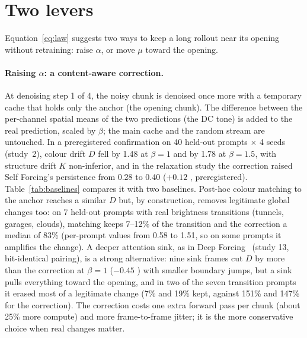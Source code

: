\section{Two levers}\label{sec:levers}
Equation~\ref{eq:law} suggests two ways to keep a long rollout near its opening without retraining: raise $\alpha$, or
move $\mu$ toward the opening.

\paragraph{Raising $\alpha$: a content-aware correction.} At denoising step 1 of 4, the noisy chunk is denoised once
more with a temporary cache that holds only the anchor (the opening chunk). The difference between the per-channel
spatial means of the two predictions (the DC tone) is added to the real prediction, scaled by $\beta$; the main cache
and the random stream are untouched. In a preregistered confirmation on 40 held-out prompts $\times$ 4 seeds
(study~2), colour drift $D$ fell by 1.48  at $\beta=1$ and by 1.78  at $\beta=1.5$, with
structure drift $K$ non-inferior, and in the relaxation study the correction raised Self Forcing's persistence from 0.28
to 0.40 ($+0.12$ , preregistered). Table~\ref{tab:baselines} compares it with two baselines. Post-hoc
colour matching to the anchor reaches a similar $D$ but, by construction, removes legitimate global changes too: on 7
held-out prompts with real brightness transitions (tunnels, garages, clouds), matching keeps 7--12\% of the transition
and the correction a median of 83\% (per-prompt values from 0.58 to 1.51, so on some prompts it amplifies the change). A
deeper attention sink, as in Deep Forcing~\cite{deepforcing} (study 13, bit-identical pairing), is a strong alternative:
nine sink frames cut $D$ by more than the correction at $\beta=1$ ($-0.45$ ) with smaller boundary
jumps, but a sink pulls everything toward the opening, and in two of the seven transition prompts it erased most of a
legitimate change (7\% and 19\% kept, against 151\% and 147\% for the correction). The correction costs one extra
forward pass per chunk (about 25\% more compute) and more frame-to-frame jitter; it is the more conservative choice
when real changes matter.


